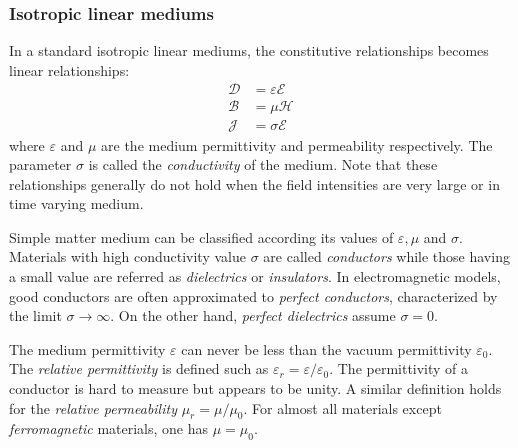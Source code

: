 \subsubsection{Isotropic linear mediums}
In a standard isotropic linear mediums, the constitutive relationships becomes linear relationships:
\begin{subequations}
 \begin{align}
  \boldsymbol{\mathcal{D}} &= \varepsilon \boldsymbol{\mathcal{E}} \\
  \boldsymbol{\mathcal{B}} &= \mu \boldsymbol{\mathcal{H}} \\
  \boldsymbol{\mathcal{J}} &= \sigma \boldsymbol{\mathcal{E}}
 \end{align}
\end{subequations}
where $\varepsilon$ and $\mu$ are the medium permittivity and permeability respectively. The parameter $\sigma$ is called the \emph{conductivity} of the medium. Note that these relationships generally do not hold when the field intensities are very large or in time varying medium.

Simple matter medium can be classified according its values of $\varepsilon, \mu$ and $\sigma$. Materials with high conductivity value $\sigma$ are called \emph{conductors} while those having a small value are referred as \emph{dielectrics} or \emph{insulators}. In electromagnetic models, good conductors are often approximated to \emph{perfect conductors}, characterized by the limit $\sigma\to\infty$. On the other hand, \emph{perfect dielectrics} assume $\sigma=0$. 

The medium permittivity $\varepsilon$ can never be less than the vacuum permittivity $\varepsilon_0$. The \emph{relative permittivity} is defined such as $\varepsilon_r=\varepsilon/\varepsilon_0$. The permittivity of a conductor is hard to measure but appears to be unity\parencite{Harrington2001}. A similar definition holds for the \emph{relative permeability} $\mu_r=\mu/\mu_0$. For almost all materials except \emph{ferromagnetic} materials, one has $\mu=\mu_0$.

